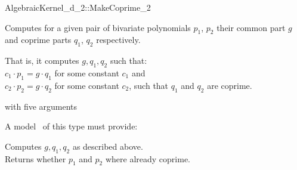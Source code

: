 \begin{ccRefFunctionObjectConcept}{AlgebraicKernel_d_2::MakeCoprime_2}

\ccDefinition
Computes for a given pair of bivariate polynomials $p_1$, $p_2$ their
common part $g$ and coprime parts $q_1$, $q_2$ respectively.

That is, it computes $g, q_1, q_2$ such that:\\
\hspace{1cm} $c_1 \cdot p_1 =  g \cdot q_1$ for some constant $c_1$ and\\
\hspace{1cm} $c_2 \cdot p_2 =  g \cdot q_2$ for some constant $c_2$, 
such that $q_1$ and $q_2$ are coprime. 

\ccRefines 
{} with five arguments 

\ccTypes
{}

\ccOperations
{}
A model \ccVar\ of this type must provide:

{ Computes $g, q_1, q_2$ as described above.\\
Returns whether $p_1$ and $p_2$ where already coprime. 
}

\ccSeeAlso
{}\\

\end{ccRefFunctionObjectConcept}
